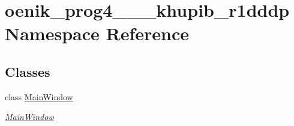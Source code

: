 \hypertarget{namespaceoenik__prog4__2019__1__khupib__r1dddp}{}\section{oenik\+\_\+prog4\+\_\+\_\+\_\+khupib\+\_\+r1dddp Namespace Reference}
\label{namespaceoenik__prog4__2019__1__khupib__r1dddp}
\subsection*{Classes}
\begin{DoxyCompactItemize}
\item 
class \mbox{\hyperlink{classoenik__prog4__2019__1__khupib__r1dddp_1_1_main_window}{Main\+Window}}
\begin{DoxyCompactList}\small\item\em \mbox{\hyperlink{classoenik__prog4__2019__1__khupib__r1dddp_1_1_main_window}{Main\+Window}} \end{DoxyCompactList}\end{DoxyCompactItemize}
